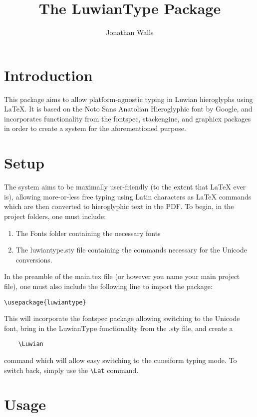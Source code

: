 \documentclass[12pt,A4]{article}
\title{The LuwianType Package}
\author{Jonathan Walls}
\begin{document}
\maketitle

\section{Introduction}

This package aims to allow platform-agnostic typing in Luwian hieroglyphs using LaTeX. It is based on the Noto Sans Anatolian Hieroglyphic font by Google, and incorporates functionality from the fontspec, stackengine, and graphicx packages in order to create a system for the aforementioned purpose.

\section{Setup}
The system aims to be maximally user-friendly (to the extent that LaTeX ever is), allowing more-or-less free typing using Latin characters as LaTeX commands which are then converted to hieroglyphic text in the PDF. To begin, in the project folders, one must include:
\begin{enumerate}
    \item The Fonts folder containing the necessary fonts
    \item The luwiantype.sty file containing the commands necessary for the Unicode conversions.
\end{enumerate}

In the preamble of the main.tex file (or however you name your main project file), one must also include the following line to import the package:\small
\begin{verbatim}
\usepackage{luwiantype}
\end{verbatim}
\normalsize\newpage
This will incorporate the fontspec package allowing switching to the Unicode font, bring in the LuwianType functionality from the .sty file, and create a 
\begin{verbatim}
    \Luwian
\end{verbatim} 
command which will allow easy switching to the cuneiform typing mode. To switch back, simply use the \verb|\Lat| command.

\section{Usage}
\end{document}
